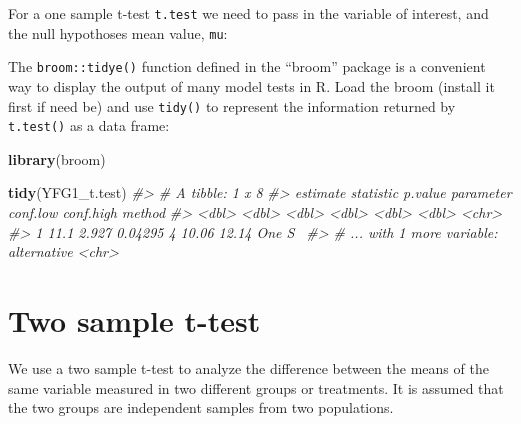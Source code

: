\documentclass[]{book}
\newenvironment{Shaded}{\begin{snugshade}}{\end{snugshade}}
\newcommand{\CommentTok}[1]{\textcolor[rgb]{0.56,0.35,0.01}{\textit{#1}}}
\newcommand{\DataTypeTok}[1]{\textcolor[rgb]{0.13,0.29,0.53}{#1}}
\newcommand{\DecValTok}[1]{\textcolor[rgb]{0.00,0.00,0.81}{#1}}
\newcommand{\FloatTok}[1]{\textcolor[rgb]{0.00,0.00,0.81}{#1}}
\newcommand{\KeywordTok}[1]{\textcolor[rgb]{0.13,0.29,0.53}{\textbf{#1}}}
\newcommand{\NormalTok}[1]{#1}
\newcommand{\OperatorTok}[1]{\textcolor[rgb]{0.81,0.36,0.00}{\textbf{#1}}}
\newcommand{\StringTok}[1]{\textcolor[rgb]{0.31,0.60,0.02}{#1}}
\theoremstyle{definition}
\theoremstyle{definition}
\theoremstyle{definition}
\theoremstyle{remark}
\begin{document}
For a one sample t-test \texttt{t.test} we need to pass in the variable
of interest, and the null hypothoses mean value, \texttt{mu}:

\begin{Shaded}
\end{Shaded}

The \texttt{broom::tidye()} function defined in the ``broom'' package is
a convenient way to display the output of many model tests in R. Load
the broom (install it first if need be) and use \texttt{tidy()} to
represent the information returned by \texttt{t.test()} as a data frame:

\begin{Shaded}
\begin{Highlighting}[]
\KeywordTok{library}\NormalTok{(broom)}

\KeywordTok{tidy}\NormalTok{(YFG1_t.test)}
\CommentTok{#> # A tibble: 1 x 8}
\CommentTok{#>   estimate statistic p.value parameter conf.low conf.high method}
\CommentTok{#>      <dbl>     <dbl>   <dbl>     <dbl>    <dbl>     <dbl> <chr> }
\CommentTok{#> 1     11.1     2.927 0.04295         4    10.06     12.14 One S~}
\CommentTok{#> # ... with 1 more variable: alternative <chr>}
\end{Highlighting}
\end{Shaded}

\hypertarget{two-sample-t-test}{%
\section{Two sample t-test}\label{two-sample-t-test}}

We use a two sample t-test to analyze the difference between the means
of the same variable measured in two different groups or treatments. It
is assumed that the two groups are independent samples from two
populations.
\end{document}
